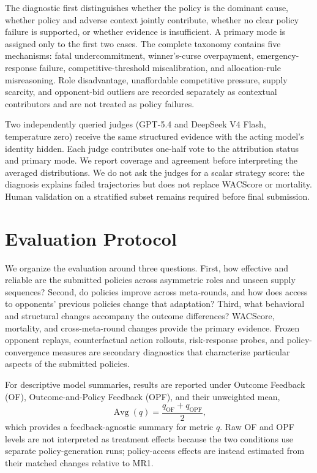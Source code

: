 \documentclass[letterpaper]{article} %
\begin{document}
The diagnostic first distinguishes whether the policy is the dominant cause,
whether policy and adverse context jointly contribute, whether no clear
policy failure is supported, or whether evidence is insufficient. A primary
mode is assigned only to the first two cases. The complete taxonomy contains
five mechanisms: fatal undercommitment, winner's-curse overpayment,
emergency-response failure, competitive-threshold miscalibration, and
allocation-rule misreasoning. Role disadvantage, unaffordable competitive
pressure, supply scarcity, and opponent-bid outliers are recorded separately
as contextual contributors and are not treated as policy failures.

Two independently queried judges (GPT-5.4 and DeepSeek V4 Flash, temperature
zero) receive the same structured evidence with the acting model's identity
hidden. Each judge contributes one-half vote to the attribution status and
primary mode. We report coverage and agreement before interpreting the
averaged distributions. We do not ask the judges for a scalar strategy score:
the diagnosis explains failed trajectories but does not replace WACScore or
mortality. Human validation on a stratified subset remains required before
final submission.

\section{Evaluation Protocol}

We organize the evaluation around three questions. First, how effective and
reliable are the submitted policies across asymmetric roles and unseen supply
sequences? Second, do policies improve across meta-rounds, and how does access
to opponents' previous policies change that adaptation? Third, what behavioral
and structural changes accompany the outcome differences? WACScore,
mortality, and cross-meta-round changes provide the primary evidence. Frozen
opponent replays, counterfactual action rollouts, risk-response probes, and
policy-convergence measures are secondary diagnostics that characterize
particular aspects of the submitted policies.

For descriptive model summaries, results are reported under Outcome Feedback
(OF), Outcome-and-Policy Feedback (OPF), and their unweighted mean,
\begin{equation}
    \operatorname{Avg}(q)
    =
    \frac{q_{\mathrm{OF}}+q_{\mathrm{OPF}}}{2},
\end{equation}
which provides a feedback-agnostic summary for metric $q$. Raw OF and OPF
levels are not interpreted as treatment effects because the two conditions
use separate policy-generation runs; policy-access effects are instead
estimated from their matched changes relative to MR1.
\end{document}
